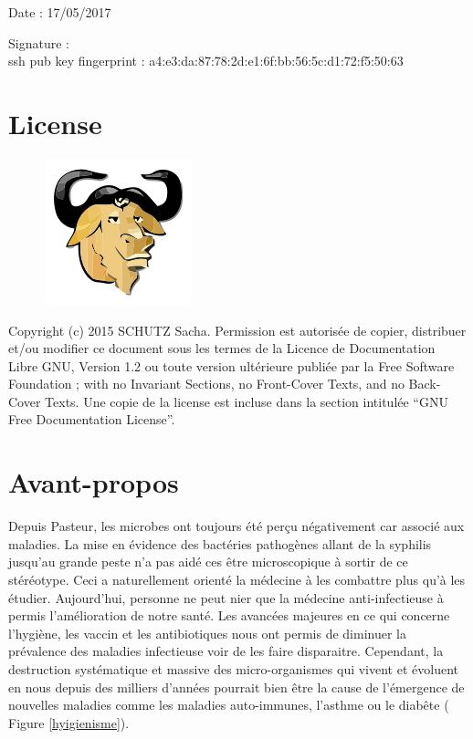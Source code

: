 \documentclass[12pt,a4paper]{article}
\begin{document}
Date : 17/05/2017

\vspace{0.5cm}

Signature : \\

ssh pub key fingerprint : a4:e3:da:87:78:2d:e1:6f:bb:56:5c:d1:72:f5:50:63
\vfill 

\section*{License}

\begin{figure}
\includegraphics[scale=0.5]{img/gfdl.png}\hfill
\end{figure}

Copyright (c) 2015 SCHUTZ Sacha. Permission est autorisée de copier,
distribuer et/ou modifier ce document sous les termes de la Licence de
Documentation Libre GNU, Version 1.2 ou toute version ultérieure publiée
par la Free Software Foundation ; with no Invariant Sections, no
Front-Cover Texts, and no Back-Cover Texts. Une copie de la license est
incluse dans la section intitulée ``GNU Free Documentation License''.

\thispagestyle{empty} 
\setcounter{page}{0}
\thispagestyle{empty} 

\newpage

\tableofcontents
\newpage


\section{Avant-propos}

Depuis Pasteur, les microbes ont toujours été perçu négativement car associé aux maladies. La mise en évidence des bactéries pathogènes allant de la syphilis jusqu'au grande peste n'a pas aidé ces être microscopique à sortir de ce stéréotype. Ceci a naturellement orienté la médecine à les combattre plus qu'à les étudier.
Aujourd'hui, personne ne peut nier que la médecine anti-infectieuse à permis l'amélioration de notre santé. 
Les avancées majeures en ce qui concerne l'hygiène, les vaccin et les antibiotiques nous ont permis de diminuer la prévalence des maladies infectieuse voir de les faire disparaitre. Cependant, la destruction systématique et massive des micro-organismes qui vivent et évoluent en nous depuis des milliers d'années pourrait bien être la cause de l'émergence de nouvelles maladies comme les maladies auto-immunes, l'asthme ou le diabête ( Figure \ref{hyigienisme}).
\end{document}
